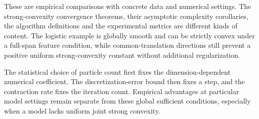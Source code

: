\documentclass[11pt,a4paper]{report}
\begin{document}
These are empirical comparisons with concrete data and numerical settings.
The strong-convexity convergence theorems, their asymptotic complexity
corollaries, the algorithm definitions and the experimental metrics are
different kinds of content. The logistic example is globally smooth and can be strictly convex under a full-span feature condition, while common-translation directions still prevent a positive uniform strong-convexity constant without additional regularization.



The statistical choice of particle count first fixes the dimension-dependent numerical coefficient. The discretization-error bound then fixes a step, and the contraction rate fixes the iteration count. Empirical advantages at particular model settings remain separate from these global sufficient conditions, especially when a model lacks uniform joint strong convexity.
\end{document}
